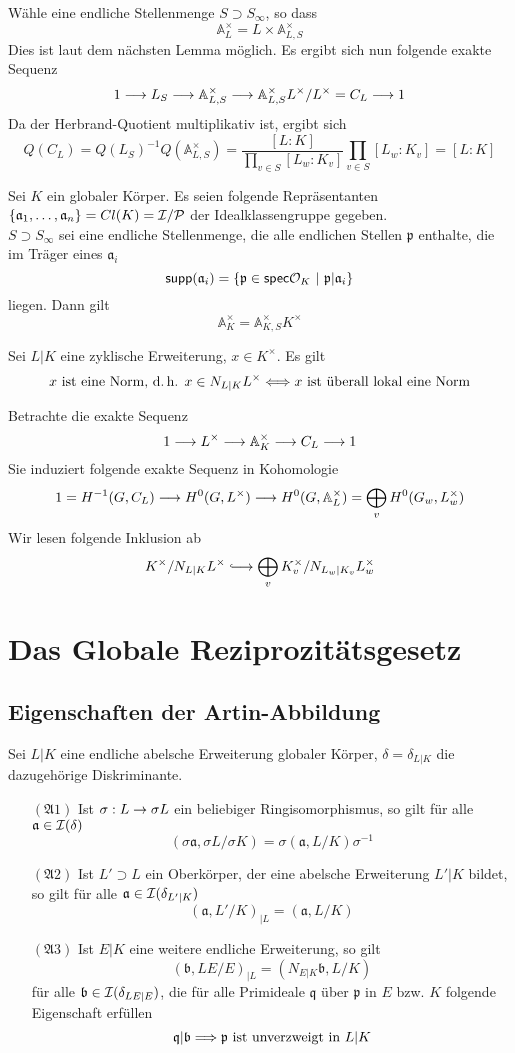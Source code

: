 \documentclass{book}
\renewcommand{\A}{\mathbb{A}}
\renewcommand{\i}{^{-1}}
\newcommand{\af}{\mathfrak{a}}
\newcommand{\Af}{\mathfrak{A}}
\renewcommand{\bf}{\mathfrak{b}}
\newcommand{\pf}{\mathfrak{p}}
\newcommand{\qf}{\mathfrak{q}}
\begin{document}
\begin{Beweis}{}
Wähle eine endliche Stellenmenge $S \supset S_\infty$, so dass
\[ \A_L^\times = L\times \A_{L,S}^\times \]
Dies ist laut dem nächsten Lemma möglich. Es ergibt sich nun folgende exakte Sequenz
\[ 1 \Pfeil{} L_S \Pfeil{} \A_{L,S}^\times \Pfeil{} \A_{L,S}^\times L^\times /L^\times = C_L \Pfeil{} 1 \]
Da der Herbrand-Quotient multiplikativ ist, ergibt sich
\[ Q(C_L) = Q(L_S)\i Q(\A_{L,S}^\times) = \frac{[L:K]}{\prod_{v\in S} [L_w : K_v]} \prod_{v\in S} [L_w : K_v] = [L:K] \]
\end{Beweis}

\Lem{}
Sei $K$ ein globaler Körper. Es seien folgende Repräsentanten $\{\af_1,\ldots , \af_n \} = Cl(K) = \I / \P$ der Idealklassengruppe gegeben.\\
$S \supset S_\infty$ sei eine endliche Stellenmenge, die alle endlichen Stellen $\pf$ enthalte, die im Träger eines $\af_i$
\[ \textsf{supp}(\af_i) = \set{\pf \in \textsf{spec}\O_K}{\pf | \af_i} \]
liegen. Dann gilt
\[ \A_K^\times = \A_{K,S}^\times K^\times \]

Sei $L|K$ eine zyklische Erweiterung, $x \in K^\times$. Es gilt
\[ x \text{ ist eine Norm, d.\,h. } x \in N_{L|K}L^\times \overset{}{\Longleftrightarrow} x \text{ ist überall lokal eine Norm} \]
\begin{Beweis}{}
Betrachte die exakte Sequenz
\[ 1 \Pfeil{} L^\times \Pfeil{} \A_K^\times \Pfeil{} C_L \Pfeil{} 1 \]
Sie induziert folgende exakte Sequenz in Kohomologie
\[ 1 = H\i(G,C_L) \Pfeil{} H^0(G,L^\times) \Pfeil{} H^0(G,\A_L^\times) = \bigoplus_v H^0(G_w, L_w^\times) \]
Wir lesen folgende Inklusion ab
\[ K^\times / N_{L|K}L^\times \Inj{} \bigoplus_v K_v^\times / N_{L_w|K_v}L_w^\times \]
\end{Beweis}

\chapter{Das Globale Reziprozitätsgesetz}
\section{Eigenschaften der Artin-Abbildung}
Sei $L|K$ eine endliche abelsche Erweiterung globaler Körper, $\delta = \delta_{L|K}$ die dazugehörige Diskriminante.
\begin{itemize}
\item[$(\Af 1)$] Ist $\sigma : L \overset{}{\rightarrow} \sigma L$ ein beliebiger Ringisomorphismus, so gilt für alle $\af \in \I(\delta)$
\[ (\sigma \af, \sigma L / \sigma K) = \sigma (\af , L/K)\sigma\i \]
\item[$(\Af 2)$] Ist $L'\supset L$ ein Oberkörper, der eine abelsche Erweiterung $L'|K$ bildet, so gilt für alle $\af \in \I(\delta_{L'|K})$
\[ (\af, L'/K)_{|L} = (\af, L/K) \]
\item[$(\Af 3)$] Ist $E|K$ eine weitere endliche Erweiterung, so gilt
\[ (\bf, LE /E)_{|L} = (N_{E|K}\bf, L/K) \]
für alle $\bf \in \I(\delta_{LE|E})$, die für alle Primideale $\qf $ über $ \pf$ in $E$ bzw. $K$ folgende Eigenschaft erfüllen
\[ \qf |\bf \Impl{} \pf \text{ ist unverzweigt in }L|K \]
\end{itemize}
\end{document}
